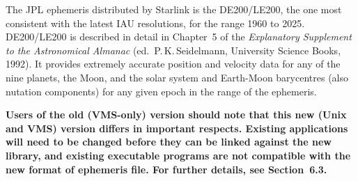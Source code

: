 The JPL ephemeris distributed by Starlink is the DE200/LE200, the one
most consistent with the latest IAU resolutions, for the range
1960 to 2025.
DE200/LE200 is described in detail
in Chapter~5 of the {\it Explanatory Supplement to the
Astronomical Almanac}\/ (ed.\ P.\,K.\,Seidelmann,
University Science Books, 1992).
It provides extremely accurate position and velocity data for any of the nine
planets, the Moon, and the solar system and Earth-Moon barycentres (also
nutation components) for any given epoch in the range of the ephemeris.

{\bf Users of the old (VMS-only) version
should note that this new (Unix and VMS) version differs
in important respects.  Existing applications will need
to be changed before they can be linked against the new
library, and existing executable programs are not
compatible with the new format of ephemeris file.  For further
details, see Section~6.3.}

